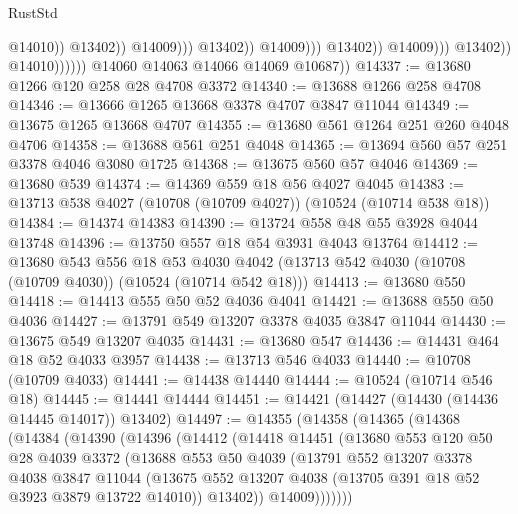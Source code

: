 \begin{lexlean}{RustStd}
\begin{coremodule}
                                                          @14010))
                                                      @13402))
                                                  @14009)))
                                            @13402))
                                        @14009)))
                                  @13402))
                              @14009)))
                        @13402))
                    @14010))))))
        @14060
        @14063
        @14066
        @14069
        @10687))
@14337 := @13680 @1266 @120 @258 @28 @4708 @3372
@14340 := @13688 @1266 @258 @4708
@14346 := @13666 @1265 @13668 @3378 @4707 @3847 @11044
@14349 := @13675 @1265 @13668 @4707
@14355 := @13680 @561 @1264 @251 @260 @4048 @4706
@14358 := @13688 @561 @251 @4048
@14365 := @13694 @560 @57 @251 @3378 @4046 @3080 @1725
@14368 := @13675 @560 @57 @4046
@14369 := @13680 @539
@14374 := @14369 @559 @18 @56 @4027 @4045
@14383 := @13713 @538 @4027 (@10708 (@10709 @4027)) (@10524 (@10714 @538 @18))
@14384 := @14374 @14383
@14390 := @13724 @558 @48 @55 @3928 @4044 @13748
@14396 := @13750 @557 @18 @54 @3931 @4043 @13764
@14412 := @13680
    @543
    @556
    @18
    @53
    @4030
    @4042
    (@13713 @542 @4030 (@10708 (@10709 @4030)) (@10524 (@10714 @542 @18)))
@14413 := @13680 @550
@14418 := @14413 @555 @50 @52 @4036 @4041
@14421 := @13688 @550 @50 @4036
@14427 := @13791 @549 @13207 @3378 @4035 @3847 @11044
@14430 := @13675 @549 @13207 @4035
@14431 := @13680 @547
@14436 := @14431 @464 @18 @52 @4033 @3957
@14438 := @13713 @546 @4033
@14440 := @10708 (@10709 @4033)
@14441 := @14438 @14440
@14444 := @10524 (@10714 @546 @18)
@14445 := @14441 @14444
@14451 := @14421 (@14427 (@14430 (@14436 @14445 @14017)) @13402)
@14497 := @14355
    (@14358
      (@14365
        (@14368
          (@14384
            (@14390
              (@14396
                (@14412
                  (@14418
                    @14451
                    (@13680
                      @553
                      @120
                      @50
                      @28
                      @4039
                      @3372
                      (@13688
                        @553
                        @50
                        @4039
                        (@13791
                          @552
                          @13207
                          @3378
                          @4038
                          @3847
                          @11044
                          (@13675 @552 @13207 @4038 (@13705 @391 @18 @52 @3923 @3879 @13722 @14010))
                          @13402))
                      @14009)))))))

\end{coremodule}
\end{lexlean}
